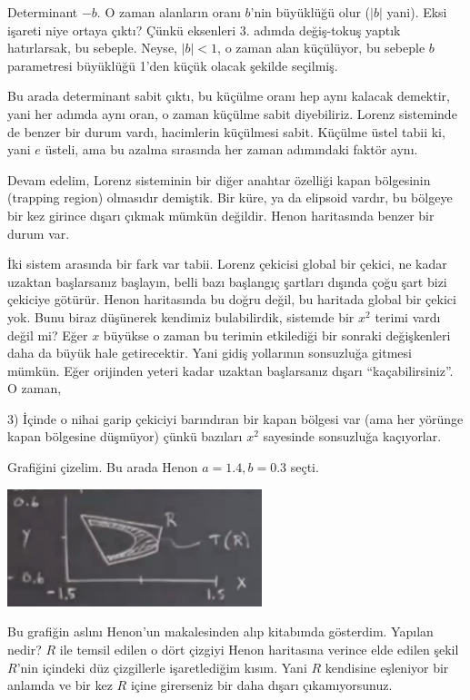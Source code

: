 \documentclass[12pt,fleqn]{article}\usepackage{../../common}
\begin{document}
Determinant $-b$. O zaman alanların oranı $b$'nin büyüklüğü olur ($|b|$
yani). Eksi işareti niye ortaya çıktı? Çünkü eksenleri 3. adımda
değiş-tokuş yaptık hatırlarsak, bu sebeple. Neyse, $|b| < 1$, o zaman alan
küçülüyor, bu sebeple $b$ parametresi büyüklüğü 1'den küçük olacak şekilde
seçilmiş.

Bu arada determinant sabit çıktı, bu küçülme oranı hep aynı kalacak
demektir, yani her adımda aynı oran, o zaman küçülme sabit
diyebiliriz. Lorenz sisteminde de benzer bir durum vardı, hacimlerin
küçülmesi sabit. Küçülme üstel tabii ki, yani $e$ üsteli, ama bu azalma
sırasında her zaman adımındaki faktör aynı.

Devam edelim, Lorenz sisteminin bir diğer anahtar özelliği kapan bölgesinin
(trapping region) olmasıdır demiştik. Bir küre, ya da elipsoid vardır, bu
bölgeye bir kez girince dışarı çıkmak mümkün değildir. Henon haritasında
benzer bir durum var. 

İki sistem arasında bir fark var tabii. Lorenz çekicisi global bir çekici,
ne kadar uzaktan başlarsanız başlayın, belli bazı başlangıç şartları
dışında çoğu şart bizi çekiciye götürür. Henon haritasında bu doğru değil,
bu haritada global bir çekici yok. Bunu biraz düşünerek kendimiz
bulabilirdik, sistemde bir $x^2$ terimi vardı değil mi? Eğer $x$ büyükse o
zaman bu terimin etkilediği bir sonraki değişkenleri daha da büyük hale
getirecektir. Yani gidiş yollarının sonsuzluğa gitmesi mümkün. Eğer
orijinden yeteri kadar uzaktan başlarsanız dışarı ``kaçabilirsiniz''. O zaman,

3) İçinde o nihai garip çekiciyi barındıran bir kapan bölgesi var (ama her
yörünge kapan bölgesine düşmüyor) çünkü bazıları $x^2$ sayesinde sonsuzluğa
kaçıyorlar.

Grafiğini çizelim. Bu arada Henon $a=1.4,b=0.3$ seçti.

\includegraphics[width=20em]{24_05.png}

Bu grafiğin aslını Henon'un makalesinden alıp kitabımda gösterdim. Yapılan
nedir? $R$ ile temsil edilen o dört çizgiyi Henon haritasına verince elde
edilen şekil $R$'nin içindeki düz çizgillerle işaretlediğim kısım. Yani
$R$ kendisine eşleniyor bir anlamda ve bir kez $R$ içine girerseniz bir
daha dışarı çıkamıyorsunuz.
\end{document}
